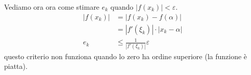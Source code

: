 \documentclass[a4paper]{article}
\begin{document}
Vediamo ora ora come stimare \(e_k\) quando \(|f(x_k)| < \varepsilon\).
\begin{align*}
    |f(x_k)| &= |f(x_k) - f(\alpha)| \\
    &= |f'(\xi_k)| \cdot |x_k - \alpha| \\
    e_k &\leq \frac{1}{|f'(\xi_k)|} \varepsilon
\end{align*}
questo criterio non funziona quando lo zero ha ordine superiore (la funzione è piatta).

\end{document}
